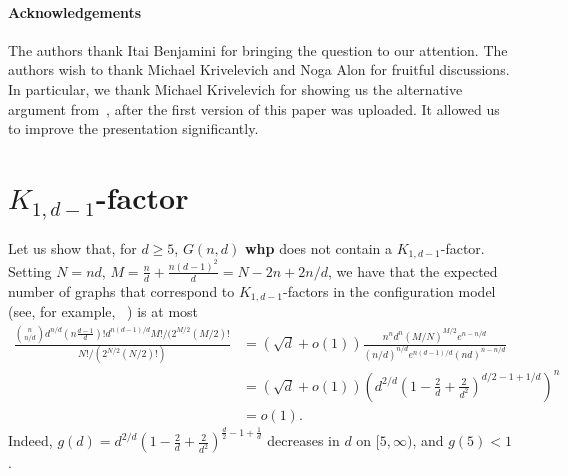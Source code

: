 \documentclass[notitlepage]{scrartcl}
\begin{document}
\paragraph{Acknowledgements} The authors thank Itai Benjamini for bringing the question to our attention. The authors wish to thank Michael Krivelevich and Noga Alon for fruitful discussions. In particular, we thank Michael Krivelevich for showing us the alternative argument from~\cite{DK}, after the first version of this paper was uploaded. It allowed us to improve the presentation significantly.


    



\appendix
\section[d-1-star-factor]{$K_{1,d-1}$-factor}
\label{appendix}
Let us show that, for $d\ge 5$, $G(n,d)$ \textbf{whp} does not contain a $K_{1,d-1}$-factor. Setting $N=nd$, $M=\frac{n}{d}+\frac{n(d-1)^2}{d}=N-2n+2n/d$, we have that the expected number of graphs that correspond to $K_{1,d-1}$-factors in the configuration model (see, for example, ~\cite{Bol_book}) is at most
\begin{align*}
    \frac{\binom{n}{n/d}d^{n/d}(n\frac{d-1}{d})!d^{n(d-1)/d}M!/(2^{M/2}(M/2)!}{N!/(2^{N/2}(N/2)!)}&=\left(\sqrt{d}+o(1)\right)\frac{n^nd^n(M/N)^{M/2}e^{n-n/d}}{(n/d)^{n/d}e^{n(d-1)/d}(nd)^{n-n/d}}\\
    &=\left(\sqrt{d}+o(1)\right)\left(d^{2/d}\left(1-\frac{2}{d}+\frac{2}{d^2}\right)^{d/2-1+1/d}\right)^n\\
    &=o(1).
\end{align*}
Indeed, $g(d)=d^{2/d}\left(1-\frac{2}{d}+\frac{2}{d^2}\right)^{\frac{d}{2}-1+\frac{1}{d}}$ decreases in $d$ on $[5,\infty)$, and $g(5)<1$.
\end{document}

